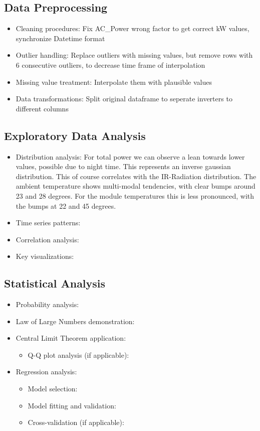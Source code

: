 \documentclass[11pt]{article}
\begin{document}
\subsection{Data Preprocessing}
\begin{itemize}
    \item Cleaning procedures: Fix AC\_Power wrong factor to get correct kW values, synchronize Datetime format 
    \item Outlier handling: Replace outliers with missing values, but remove rows with 6 consecutive outliers, to decrease time frame of interpolation
    \item Missing value treatment: Interpolate them with plausible values
    \item Data transformations: Split original dataframe to seperate inverters to different columns
\end{itemize}

\subsection{Exploratory Data Analysis}
\begin{itemize}
    \item Distribution analysis: For total power we can observe a lean towards lower values, possible due to night time. This represents an inverse gaussian distribution. This of course correlates with the IR-Radiation distribution. The ambient temperature shows multi-modal tendencies, with clear bumps around 23 and 28 degrees. For the module temperatures this is less pronounced, with the bumps at 22 and 45 degrees.
    \item Time series patterns:
    \item Correlation analysis:
    \item Key visualizations:
\end{itemize}

\subsection{Statistical Analysis}
\begin{itemize}
    \item Probability analysis:
    \item Law of Large Numbers demonstration:
    \item Central Limit Theorem application:
    \begin{itemize}
        \item Q-Q plot analysis (if applicable):
    \end{itemize}
    \item Regression analysis:
    \begin{itemize}
        \item Model selection:
        \item Model fitting and validation:
        \item Cross-validation (if applicable):
    \end{itemize}
\end{itemize}
\end{document}
